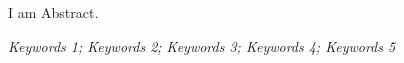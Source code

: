 \newpage
\vspace{-1cm}
\chapter*{\xiaosan {}}
\vspace{-0.5cm}

I am Abstract.

\hspace{-0.5cm}
{}
\textit{Keywords 1; Keywords 2; Keywords 3; Keywords 4; Keywords 5}